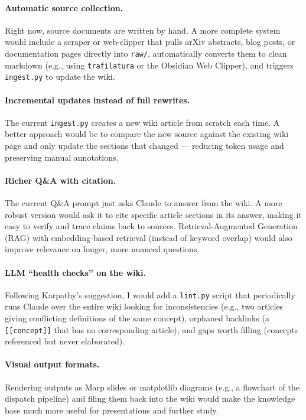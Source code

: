 \documentclass[11pt,a4paper]{article}
\begin{document}
\paragraph{Automatic source collection.}
Right now, source documents are written by hand.
A more complete system would include a scraper or web-clipper that pulls
arXiv abstracts, blog posts, or documentation pages directly into \texttt{raw/},
automatically converts them to clean markdown (e.g., using \texttt{trafilatura}
or the Obsidian Web Clipper), and triggers \texttt{ingest.py} to update the wiki.

\paragraph{Incremental updates instead of full rewrites.}
The current \texttt{ingest.py} creates a new wiki article from scratch each time.
A better approach would be to compare the new source against the existing wiki page
and only update the sections that changed --- reducing token usage and preserving
manual annotations.

\paragraph{Richer Q\&A with citation.}
The current Q\&A prompt just asks Claude to answer from the wiki.
A more robust version would ask it to cite specific article sections in its answer,
making it easy to verify and trace claims back to sources.
Retrieval-Augmented Generation (RAG) with embedding-based retrieval (instead of
keyword overlap) would also improve relevance on longer, more nuanced questions.

\paragraph{LLM ``health checks'' on the wiki.}
Following Karpathy's suggestion, I would add a \texttt{lint.py} script that
periodically runs Claude over the entire wiki looking for inconsistencies
(e.g., two articles giving conflicting definitions of the same concept),
orphaned backlinks (a \texttt{[[concept]]} that has no corresponding article),
and gaps worth filling (concepts referenced but never elaborated).

\paragraph{Visual output formats.}
Rendering outputs as Marp slides or matplotlib diagrams (e.g., a flowchart of the
dispatch pipeline) and filing them back into the wiki would make the knowledge base
much more useful for presentations and further study.
\end{document}
